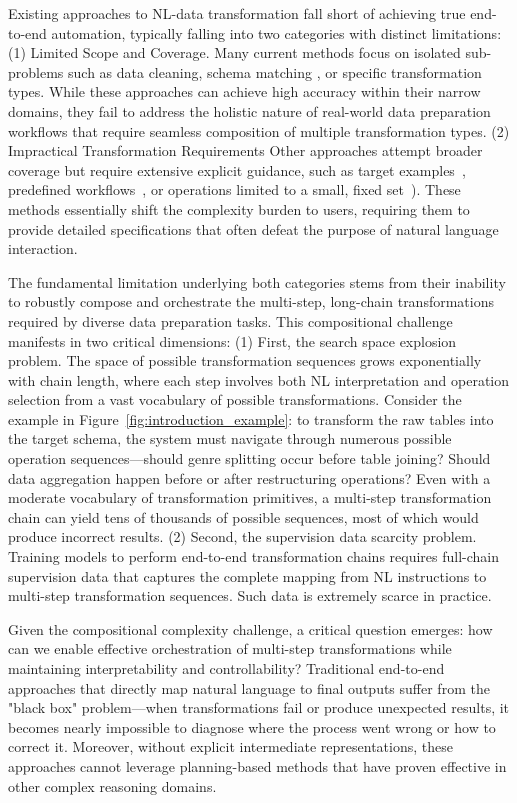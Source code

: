 Existing approaches to NL-\nlwhat data transformation fall short of achieving true end-to-end automation, typically falling into two categories with distinct limitations:
{(1) Limited Scope and Coverage.} Many current methods focus on isolated sub-problems such as data cleaning, schema matching , or specific transformation types. While these approaches can achieve high accuracy within their narrow domains, they fail to address the holistic nature of real-world data preparation workflows that require seamless composition of multiple transformation types.
{(2) Impractical Transformation Requirements} Other approaches attempt broader coverage but require extensive explicit guidance, such as target examples~\cite{he2018transform}, predefined workflows~\cite{ge2025text}, or operations limited to a small, fixed set~\cite{DBLP:journals/pvldb/LiHYWC23}). These methods essentially shift the complexity burden to users, requiring them to provide detailed specifications that often defeat the purpose of natural language interaction.

 The fundamental limitation underlying both categories stems from their inability to robustly compose and orchestrate the multi-step, long-chain transformations required by diverse data preparation tasks. This compositional challenge manifests in two critical dimensions: (1) First, the search space explosion problem. The space of possible transformation sequences grows exponentially with chain length, where each step involves both NL interpretation and operation selection from a vast vocabulary of possible transformations. Consider the example in Figure~\ref{fig:introduction_example}: to transform the raw tables into the target schema, the system must navigate through numerous possible operation sequences—should genre splitting occur before table joining? Should data aggregation happen before or after restructuring operations? Even with a moderate vocabulary of transformation primitives, a multi-step transformation chain can yield tens of thousands of possible sequences, most of which would produce incorrect results. (2) Second, the supervision data scarcity problem. Training models to perform end-to-end transformation chains requires full-chain supervision data that captures the complete mapping from NL instructions to multi-step transformation sequences. Such data is extremely scarce in practice.

Given the compositional complexity challenge, a critical question emerges: how can we enable effective orchestration of multi-step transformations while maintaining interpretability and controllability? Traditional end-to-end approaches that directly map natural language to final outputs suffer from the "black box" problem—when transformations fail or produce unexpected results, it becomes nearly impossible to diagnose where the process went wrong or how to correct it. Moreover, without explicit intermediate representations, these approaches cannot leverage planning-based methods that have proven effective in other complex reasoning domains.

